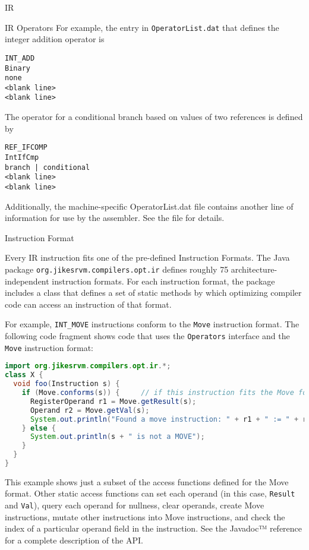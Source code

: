 \begin{section}{IR}
\begin{subsection}{IR Operators}
For example, the entry in \verb#OperatorList.dat# that defines the integer addition operator is
\begin{lstlisting}
INT_ADD
Binary
none
<blank line>
<blank line>
\end{lstlisting}

The operator for a conditional branch based on values of two references is defined by
\begin{lstlisting}
REF_IFCOMP
IntIfCmp
branch | conditional
<blank line>
<blank line>
\end{lstlisting}
Additionally, the machine-specific OperatorList.dat file contains another line of information for use by the assembler. See the file for details.

\end{subsection}


\begin{subsection}{Instruction Format}

Every IR instruction fits one of the pre-defined Instruction Formats. The Java package \verb#org.jikesrvm.compilers.opt.ir# defines roughly 75 architecture-independent instruction formats. For each instruction format, the package includes a class that defines a set of static methods by which optimizing compiler code can access an instruction of that format.

For example, \verb#INT_MOVE# instructions conform to the \verb#Move# instruction format. The following code fragment shows code that uses the \verb#Operators# interface and the \verb#Move# instruction format:

\begin{lstlisting}[language=Java]
import org.jikesrvm.compilers.opt.ir.*;
class X {
  void foo(Instruction s) {
    if (Move.conforms(s)) {     // if this instruction fits the Move format
      RegisterOperand r1 = Move.getResult(s);
      Operand r2 = Move.getVal(s);
      System.out.println("Found a move instruction: " + r1 + " := " + r2);
    } else {
      System.out.println(s + " is not a MOVE");
    }
  }
}
\end{lstlisting}

This example shows just a subset of the access functions defined for the Move format. Other static access functions can set each operand (in this case, \verb#Result# and \verb#Val#), query each operand for nullness, clear operands, create Move instructions, mutate other instructions into Move instructions, and check the index of a particular operand field in the instruction. See the Javadoc™ reference for a complete description of the API.


\end{subsection}
\end{section}
